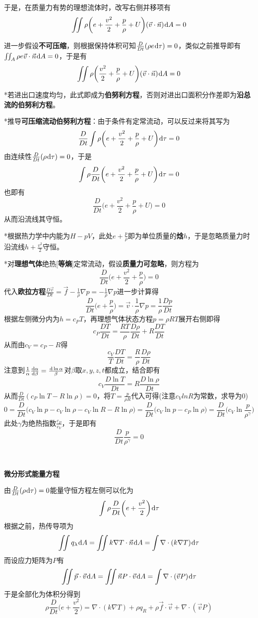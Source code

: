 \documentclass[a4paper,UTF8,fontset=windows]{ctexart}
\newcommand*{\dr}{\hspace{0.07em}\mathrm{d}}
\begin{document}
于是，在质量力有势的理想流体时，改写右侧并移项有
$$\iint \rho\bigg(e+\frac{v^2}{2}+\frac{p}{\rho}+U\bigg)(\vec{v}\cdot\vec{n})\dr A=0$$

进一步假设\textbf{不可压缩}，则根据保持体积可知$\frac{D}{Dt}(\rho e\dr\tau)=0$，类似之前推导即有$\iint_A\rho e\vec{v}\cdot\vec{n}\dr A=0$，于是有
$$\iint\rho\bigg(\frac{v^2}{2}+\frac{p}{\rho}+U\bigg)(\vec{v}\cdot\vec{n})\dr A=0$$

*若进出口速度均匀，此式即成为\textbf{伯努利方程}，否则对进出口面积分作差即为\textbf{沿总流的伯努利方程}。

*推导\textbf{可压缩流动伯努利方程}：由于条件有定常流动，可以反过来将其写为
$$\frac{D}{Dt}\int\rho\bigg(e+\frac{v^2}{2}+\frac{p}{\rho}+U\bigg)\dr\tau=0$$
由连续性$\frac{D}{Dt}(\rho\dr\tau)=0$，于是
$$\int\rho\frac{D}{Dt}\bigg(e+\frac{v^2}{2}+\frac{p}{\rho}+U\bigg)\dr\tau=0$$
也即有
$$\frac{D}{Dt}\bigg(e+\frac{v^2}{2}+\frac{p}{\rho}+U\bigg)=0$$
从而沿流线其守恒。

*根据热力学中内能为$H-pV$，此处$e+\frac{p}{\rho}$即为单位质量的\textbf{焓}$h$，于是忽略质量力时沿流线$h+\frac{v^2}{2}$守恒。

*对\textbf{理想气体}绝热[\textbf{等熵}]定常流动，假设\textbf{质量力可忽略}，则方程为
$$\frac{D}{Dt}\bigg(e+\frac{v^2}{2}+\frac{p}{\rho}\bigg)=0$$
代入\textbf{欧拉方程}$\frac{D\vec{v}}{Dt}=\vec{f}-\frac{1}{\rho}\nabla p=-\frac{1}{\rho}\nabla p$进一步计算得
$$\frac{D}{Dt}\bigg(e+\frac{p}{\rho}\bigg)=\vec{v}\cdot\frac{1}{\rho}\nabla p=\frac{1}{\rho}\frac{Dp}{Dt}$$
根据左侧微分内为$h=c_PT$，再理想气体状态方程$p=\rho RT$展开右侧即得
$$c_P\frac{DT}{Dt}=\frac{RT}{\rho}\frac{D\rho}{Dt}+R\frac{DT}{Dt}$$
从而由$c_V=c_P-R$得
$$\frac{c_V}{T}\frac{DT}{Dt}=\frac{R}{\rho}\frac{D\rho}{Dt}$$
注意到$\frac{1}{\alpha}\frac{\dr\alpha}{\dr\beta}=\frac{\dr\ln\alpha}{\beta}$对$\beta$取$x,y,z,t$都成立，结合即有
$$c_V\frac{D\ln T}{Dt}=R\frac{D\ln \rho}{Dt}$$
从而$\frac{D}{Dt}(c_P\ln T-R\ln\rho)=0$，将$T=\frac{p}{\rho R}$代入可得(注意$c_Vln R$为常数，求导为0)
$$0=\frac{D}{Dt}\bigg(c_V\ln p-c_V\ln\rho-c_V\ln R-R\ln\rho)=\frac{D}{Dt}\bigg(c_V\ln p-c_P\ln\rho)=\frac{D}{Dt}\bigg(c_V\ln\frac{p}{\rho^\gamma}\bigg)$$
此处$\gamma$为绝热指数$\frac{c_P}{c_V}$，于是即有
$$\frac{D}{Dt}\frac{p}{\rho^\gamma}=0$$

\

\textbf{微分形式能量方程}

由$\frac{D}{Dt}(\rho\dr\tau)=0$能量守恒方程左侧可以化为
$$\int\rho\frac{D}{Dt}\bigg(e+\frac{v^2}{2}\bigg)\dr\tau$$
根据之前，热传导项为
$$\iint q_\lambda\dr A=\iint k\nabla T\cdot\vec{n}\dr A=\int\nabla\cdot(k\nabla T)\dr\tau$$
而设应力矩阵为$P$有
$$\iint\vec{p}\cdot\vec{v}\dr A=\iint \vec{n}P\cdot\vec{v}\dr A=\int\nabla\cdot(\vec{v}P)\dr\tau$$
于是全部化为体积分得到
$$\rho\frac{D}{Dt}\bigg(e+\frac{v^2}{2}\bigg)=\nabla\cdot(k\nabla T)+\rho q_R+\rho\vec{f}\cdot\vec{v}+\nabla\cdot(\vec{v}P)$$
\end{document}
